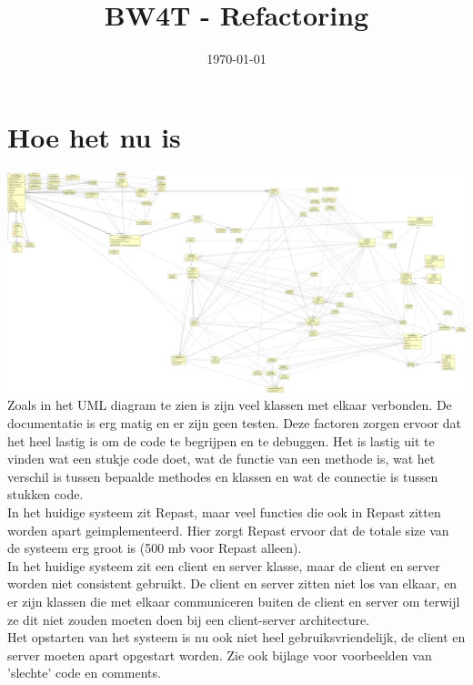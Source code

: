 \documentclass[11pt,a4paper]{article}
\title{BW4T - Refactoring}
\date{\today}
\begin{document}
\maketitle

\section{Hoe het nu is}
\includegraphics[width=\linewidth]{old.png}
Zoals in het UML diagram te zien is zijn veel klassen met elkaar verbonden. De documentatie is erg matig en er zijn geen testen. Deze factoren zorgen ervoor dat het heel lastig is om de code te begrijpen en te debuggen. Het is lastig uit te vinden wat een stukje code doet, wat de functie van een methode is, wat het verschil is tussen bepaalde methodes en klassen en wat de connectie is tussen stukken code. \\
In het huidige systeem zit Repast, maar veel functies die ook in Repast zitten worden apart geimplementeerd. Hier zorgt Repast ervoor dat de totale size van de systeem erg groot is (500 mb voor Repast alleen). \\
In het huidige systeem zit een client en server klasse, maar de client en server worden niet consistent gebruikt. De client en server zitten niet los van elkaar, en er zijn klassen die met elkaar communiceren buiten de client en server om terwijl ze dit niet zouden moeten doen bij een client-server architecture. \\
Het opstarten van het systeem is nu ook niet heel gebruiksvriendelijk, de client en server moeten apart opgestart worden. 
Zie ook bijlage voor voorbeelden van 'slechte' code en comments.
\end{document}
